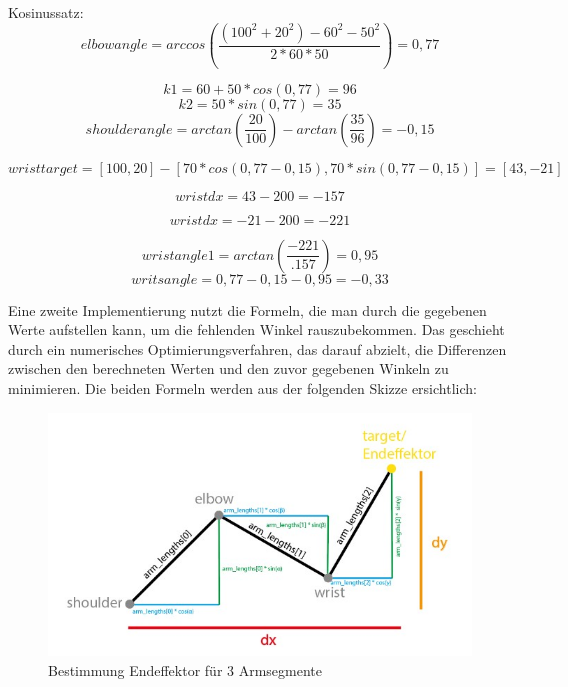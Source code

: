 \documentclass[12pt]{article}
\begin{document}
    Kosinussatz:
    \[
        elbowangle = arccos(\frac{(100^2 +20^2)-60^2-50^2}{2*60*50}) = 0,77
    \]

    

    \[
        k1 = 60 +50 * cos(0,77) = 96
    \]
    \[
        k2 = 50*sin(0,77) = 35
    \]
    \[
        shoulderangle = arctan(\frac{20}{100}) - arctan(\frac{35}{96}) = -0,15
    \]

    

    \[
        wristtarget = [100, 20] - [70 * cos(0,77 - 0,15), 70* sin(0,77 -0,15)] = [43, -21]
    \]

    \[
        wristdx = 43 - 200 = -157
    \]

    \[
        wristdx = -21 - 200 = -221
    \]

    \[
        wristangle1 = arctan(\frac{-221}{.157})= 0,95
    \]
    \[
        writsangle = 0,77 -0,15 -0,95 = -0,33
    \]

    

    Eine zweite Implementierung nutzt die Formeln, die man durch die gegebenen Werte aufstellen kann, um die fehlenden
    Winkel rauszubekommen. Das geschieht durch ein numerisches Optimierungsverfahren, das darauf abzielt, die Differenzen
    zwischen den berechneten Werten und den zuvor gegebenen Winkeln zu minimieren.
    Die beiden Formeln werden aus der folgenden Skizze ersichtlich:

    \begin{figure}[h]
        \centering
        \includegraphics[width = \linewidth]{Bild 5}
        \caption{Bestimmung Endeffektor für 3 Armsegmente}
    \end{figure}
\end{document}

